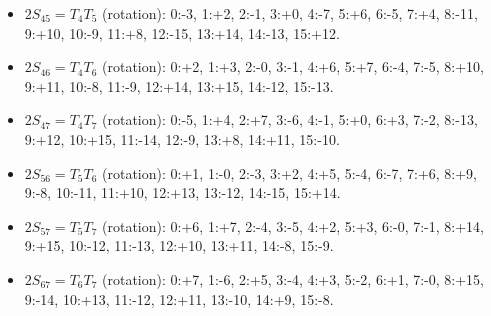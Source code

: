 \documentclass[
  10pt,
]{article}
\begin{document}
\begin{itemize}
  15:-10.
\item
  \(2S_{45} = T_4T_5\) (rotation): 0:-3, 1:+2, 2:-1, 3:+0, 4:-7, 5:+6,
  6:-5, 7:+4, 8:-11, 9:+10, 10:-9, 11:+8, 12:-15, 13:+14, 14:-13,
  15:+12.
\item
  \(2S_{46} = T_4T_6\) (rotation): 0:+2, 1:+3, 2:-0, 3:-1, 4:+6, 5:+7,
  6:-4, 7:-5, 8:+10, 9:+11, 10:-8, 11:-9, 12:+14, 13:+15, 14:-12,
  15:-13.
\item
  \(2S_{47} = T_4T_7\) (rotation): 0:-5, 1:+4, 2:+7, 3:-6, 4:-1, 5:+0,
  6:+3, 7:-2, 8:-13, 9:+12, 10:+15, 11:-14, 12:-9, 13:+8, 14:+11,
  15:-10.
\item
  \(2S_{56} = T_5T_6\) (rotation): 0:+1, 1:-0, 2:-3, 3:+2, 4:+5, 5:-4,
  6:-7, 7:+6, 8:+9, 9:-8, 10:-11, 11:+10, 12:+13, 13:-12, 14:-15,
  15:+14.
\item
  \(2S_{57} = T_5T_7\) (rotation): 0:+6, 1:+7, 2:-4, 3:-5, 4:+2, 5:+3,
  6:-0, 7:-1, 8:+14, 9:+15, 10:-12, 11:-13, 12:+10, 13:+11, 14:-8,
  15:-9.
\item
  \(2S_{67} = T_6T_7\) (rotation): 0:+7, 1:-6, 2:+5, 3:-4, 4:+3, 5:-2,
  6:+1, 7:-0, 8:+15, 9:-14, 10:+13, 11:-12, 12:+11, 13:-10, 14:+9,
  15:-8.
\end{itemize}
\end{document}

